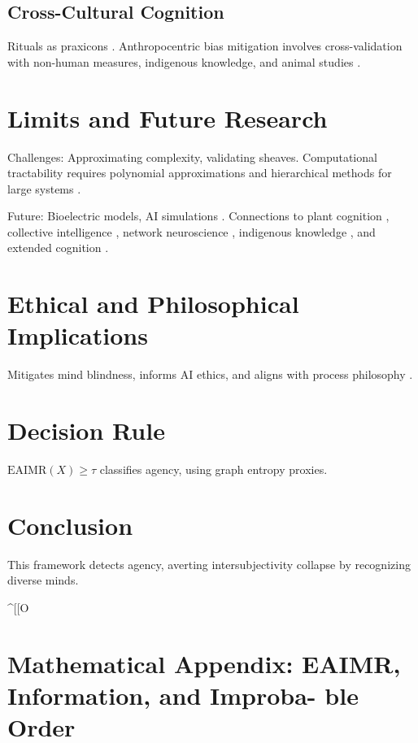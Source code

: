 \documentclass{article}
\begin{document}
\subsection{Cross-Cultural Cognition}
Rituals as praxicons \citep{ortega1961meditations}. Anthropocentric bias mitigation involves cross-validation with non-human measures, indigenous knowledge, and animal studies \citep{kimmerer2013braiding}.

\section{Limits and Future Research}
\label{sec:limits}

Challenges: Approximating complexity, validating sheaves. Computational tractability requires polynomial approximations and hierarchical methods for large systems \citep{kolmogorov1965three}.

Future: Bioelectric models, AI simulations \citep{levin2019computational}. Connections to plant cognition \citep{calvo2020plants}, collective intelligence \citep{camazine2001self}, network neuroscience \citep{bassett2017network}, indigenous knowledge \citep{kimmerer2013braiding}, and extended cognition \citep{clark2010supersizing}.

\section{Ethical and Philosophical Implications}
\label{sec:ethics}

Mitigates mind blindness, informs AI ethics, and aligns with process philosophy \citep{dennett1987intentional, whitehead1929process, deleuze1987thousand}.

\section{Decision Rule}
\label{sec:decision}

\(\text{EAIMR}(X) \geq \tau\) classifies agency, using graph entropy proxies.

\section{Conclusion}
\label{sec:conclusion}

This framework detects agency, averting intersubjectivity collapse by recognizing diverse minds.

\appendix
^[[O
\section{Mathematical Appendix: EAIMR, Information, and Improba-
ble Order}
\end{document}
